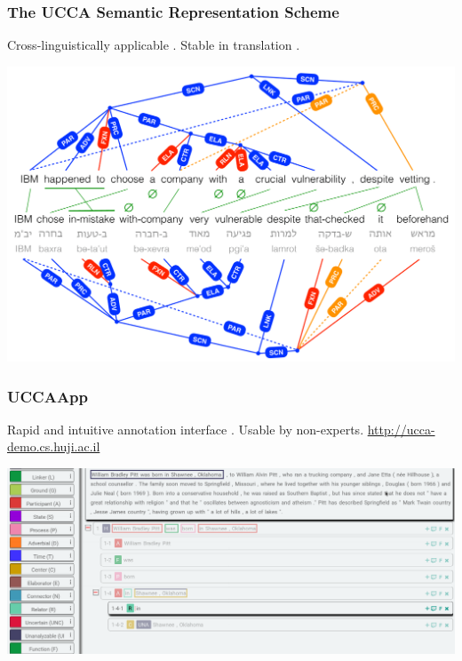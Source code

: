 \documentclass[t]{beamer}
\begin{document}
\begin{frame}
\frametitle{The UCCA Semantic Representation Scheme}
Cross-linguistically applicable \cite{abend2013universal}.
Stable in translation \cite{sulem2015conceptual}.
\vfill
\begin{adjustbox}{center}
  \includegraphics[width=\textwidth,height=\textheight,keepaspectratio]{crosslinguistic.png}
\end{adjustbox}
\end{frame}

\begin{frame}
\frametitle{UCCAApp}
Rapid and intuitive annotation interface \cite{abend2017uccaapp}.
Usable by non-experts.
\footnotesize\url{http://ucca-demo.cs.huji.ac.il}
\vfill
\begin{adjustbox}{center}
  \includegraphics[width=\pagewidth,height=\textheight,keepaspectratio]{uccaapp.png}
\end{adjustbox}
\end{frame}
\end{document}
